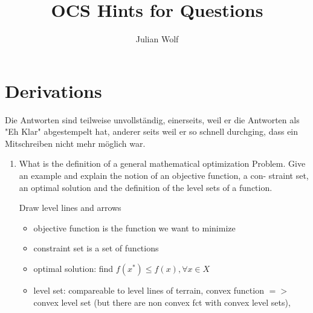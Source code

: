 \documentclass{report}
\title{OCS Hints for Questions}
\author{Julian Wolf}
\newcommand{\question}[1]{{\small\textsf{#1}}}
\begin{document}
\maketitle

\section*{Derivations}
Die Antworten sind teilweise unvollständig, einerseits, weil er die Antworten als "Eh Klar"
abgestempelt hat, anderer seits weil er so schnell durchging, dass ein Mitschreiben nicht mehr
möglich war.

\begin{enumerate}
\item \question{What is the definition of a general mathematical optimization Problem.  Give an
    example and explain the notion of an objective function, a con- straint set, an optimal solution
    and the definition of the level sets of a function.}

  Draw level lines and arrows
\begin{itemize}
\item objective function is the function we want to minimize
\item constraint set is a set of functions
\item optimal solution: find $f(x^*) \leq f(x), \forall x \in X$
\item level set: compareable to level lines of terrain, convex function $=>$ convex level set (but
  there are non convex fct with convex level sets),
\end{itemize}


\end{enumerate}
\end{document}
